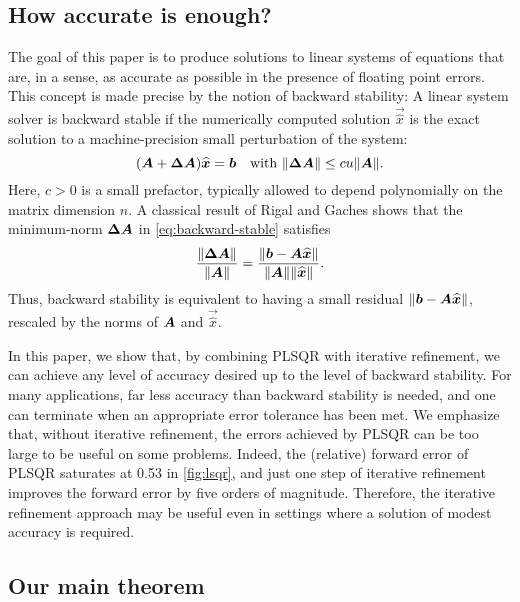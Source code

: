 \documentclass[onefignum,onetabnum,pagebackref,dvipsnames]{siamart220329}
\begin{document}
\subsection{How accurate is enough?\nopunct}
The goal of this paper is to produce solutions to linear systems of equations that are, in a sense, as accurate as possible in the presence of floating point errors.
This concept is made precise by the notion of backward stability: A linear system solver is backward stable if the numerically computed solution $\vec{\hat{x}}$ is the exact solution to a machine-precision small perturbation of the system:
%
\begin{equation} \label{eq:backward-stable}
    (\mat{A} + \mat{\Delta A})\vec{\hat{x}} = \vec{b} \quad \text{with } \norm{\mat{\Delta A}} \le c u \norm{\mat{A}}.
\end{equation}
%
Here, $c > 0$ is a small prefactor, typically allowed to depend polynomially on the matrix dimension $n$.
A classical result of Rigal and Gaches \cite[Thm.~7.1]{Hig02} shows that the minimum-norm $\boldsymbol{\Delta A}$ in \cref{eq:backward-stable} satisfies
%
\begin{equation} \label{eq:rigal-gaches}
    \frac{\norm{\mat{\Delta A}}}{\norm{\mat{A}}} = \frac{\norm{\vec{b} - \mat{A}\vec{\hat{x}}}}{\norm{\mat{A}}\norm{\vec{\hat{x}}}}.    
\end{equation}
%
Thus, backward stability is equivalent to having a small residual $\norm{\vec{b}-\mat{A}\vec{\hat{x}}}$, rescaled by the norms of $\boldsymbol{A}$ and $\vec{\hat{x}}$.

In this paper, we show that, by combining PLSQR with iterative refinement, we can achieve any level of accuracy desired up to the level of backward stability.
For many applications, far less accuracy than backward stability is needed, and one can terminate when an appropriate error tolerance has been met.
We emphasize that, without iterative refinement, the errors achieved by PLSQR can be too large to be useful on some problems.
Indeed, the (relative) forward error of PLSQR saturates at 0.53 in \cref{fig:lsqr}, and just one step of iterative refinement improves the forward error by five orders of magnitude.
Therefore, the iterative refinement approach may be useful even in settings where a solution of modest accuracy is required.

\subsection{Our main theorem}
\end{document}
